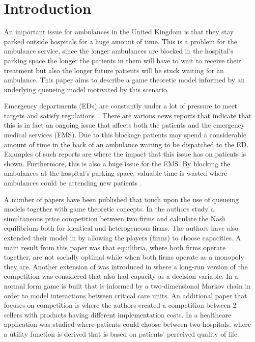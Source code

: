 \section{Introduction}

An important issue for ambulances in the United Kingdom is that they stay 
parked outside hospitals for a huge amount of time. 
This is a problem for the ambulance service, since the longer ambulances are
blocked in the hospital's parking space the longer the patients in them will
have to wait to receive their treatment but also the longer future patients 
will be stuck waiting for an ambulance.
This paper aims to describe a game theoretic model informed by an underlying 
queueing model motivated by this scenario.

Emergency departments (EDs) are constantly under a lot of pressure to meet 
targets and satisfy regulations~\cite{EmergencyDepartmentWinterPressures}.
There are various news reports that indicate that this is in fact an ongoing 
issue that affects both the patients and the emergency medical services (EMS).
Due to this blockage patients may spend a considerable amount of time in the 
back of an ambulance waiting to be dispatched to the ED.
Examples of such reports are \cite{mirror, thenews, bmj} where
the impact that this issue has on patients is shown. 
Furthermore, this is also a huge issue for the EMS.
By blocking the ambulances at the hospital's parking space, valuable time is 
wasted where ambulances could be attending new patients \cite{eastanglia}.

A number of papers have been published that touch upon the use of 
queueing models together with game theoretic concepts.
In \cite{FirmCompetition} the authors study a simultaneous price competition 
between two firms and calculate the Nash equilibrium both for identical and 
heterogeneous firms. 
The authors have also extended their model in \cite{FirmCompetition2} by 
allowing the players (firms) to choose capacities. 
A main result from this paper was that equilibria, where both firms operate
together, are not socially optimal while when both firms operate as a monopoly 
they are.
Another extension of \cite{FirmCompetition} was introduced in 
\cite{FirmCompetitionExtension} where a long-run version of the competition was 
considered that also had capacity as a decision variable.
In \cite{knight2017measuring} a normal form game is built that is informed by a 
two-dimensional Markov chain in order to model interactions between critical
care units.
An additional paper that focuses on competition is \cite{fan2009short} where
the authors created a competition between 2 sellers with products having 
different implementation costs.
In \cite{sadat2015can} a healthcare application was studied where patients 
could choose between two hospitals, where a utility function is derived that is
based on patients' perceived quality of life.

